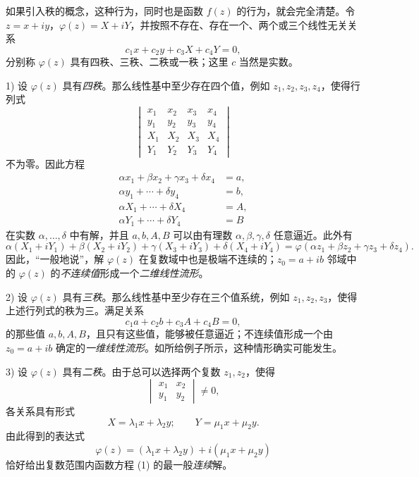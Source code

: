 如果引入秩的概念，这种行为，同时也是函数 $f(z)$ 的行为，就会完全清楚。令 $z=x+iy$，$\varphi(z)=X+iY$，并按照不存在、存在一个、两个或三个线性无关关系
\[
c_1x+c_2y+c_3X+c_4Y=0,
\]
分别称 $\varphi(z)$ 具有四秩、三秩、二秩或一秩；这里 $c$ 当然是实数。

1) 设 $\varphi(z)$ 具有\emph{四秩}。那么线性基中至少存在四个值，例如 $z_1,z_2,z_3,z_4$，使得行列式
\[
\begin{vmatrix}
x_1&x_2&x_3&x_4\\
y_1&y_2&y_3&y_4\\
X_1&X_2&X_3&X_4\\
Y_1&Y_2&Y_3&Y_4
\end{vmatrix}
\]
不为零。因此方程
\[
\begin{aligned}
\alpha x_1+\beta x_2+\gamma x_3+\delta x_4&=a,\\
\alpha y_1+\cdots+\delta y_4&=b,\\
\alpha X_1+\cdots+\delta X_4&=A,\\
\alpha Y_1+\cdots+\delta Y_4&=B
\end{aligned}
\]
在实数 $\alpha,\ldots,\delta$ 中有解，并且 $a,b,A,B$ 可以由有理数 $\alpha,\beta,\gamma,\delta$ 任意逼近。此外有
\[
\alpha(X_1+iY_1)+\beta(X_2+iY_2)+\gamma(X_3+iY_3)+\delta(X_4+iY_4)
 =\varphi(\alpha z_1+\beta z_2+\gamma z_3+\delta z_4).
\]
因此，“一般地说”，解 $\varphi(z)$ 在复数域中也是极端不连续的；$z_0=a+ib$ 邻域中的 $\varphi(z)$ 的\emph{不连续值}形成一个\emph{二维线性流形}。

2) 设 $\varphi(z)$ 具有\emph{三秩}。那么线性基中至少存在三个值系统，例如 $z_1,z_2,z_3$，使得上述行列式的秩为三。满足关系
\[
c_1a+c_2b+c_3A+c_4B=0,
\]
的那些值 $a,b,A,B$，且只有这些值，能够被任意逼近；不连续值形成一个由 $z_0=a+ib$ 确定的\emph{一维线性流形}。如所给例子所示，这种情形确实可能发生。

3) 设 $\varphi(z)$ 具有\emph{二秩}。由于总可以选择两个复数 $z_1,z_2$，使得
\[
\begin{vmatrix}x_1&x_2\\ y_1&y_2\end{vmatrix}\ne0,
\]
各关系具有形式
\[
X=\lambda_1x+\lambda_2y;\qquad Y=\mu_1x+\mu_2y.
\]
由此得到的表达式
\[
\varphi(z)=(\lambda_1x+\lambda_2y)+i(\mu_1x+\mu_2y)
\]
恰好给出复数范围内函数方程 (1) 的最一般\emph{连续}解。

